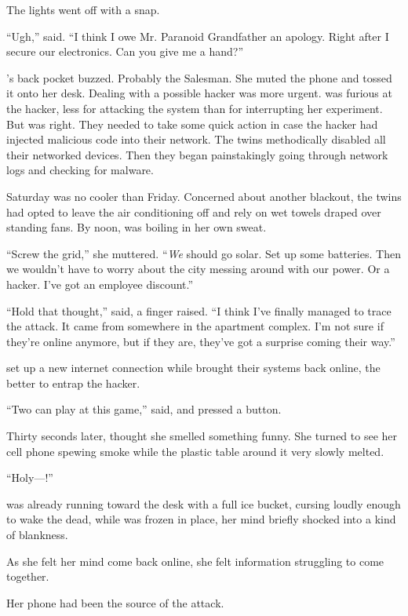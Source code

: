 The lights went off with a snap.

``Ugh,'' {\sidetag} said. ``I think I owe Mr. Paranoid Grandfather an apology. Right after I secure our electronics. Can you give me a hand?''

{\protag}'s back pocket buzzed. Probably the Salesman. She muted the phone and tossed it onto her desk. Dealing with a possible hacker was more urgent. {\protag} was furious at the hacker, less for attacking the system than for interrupting her experiment. But {\sidetag} was right. They needed to take some quick action in case the hacker had injected malicious code into their network. The twins methodically disabled all their networked devices. Then they began painstakingly going through network logs and checking for malware.

Saturday was no cooler than Friday. Concerned about another blackout, the twins had opted to leave the air conditioning off and rely on wet towels draped over standing fans. By noon, {\protag} was boiling in her own sweat.

``Screw the grid,'' she muttered. ``\emph{We} should go solar. Set up some batteries. Then we wouldn't have to worry about the city messing around with our power. Or a hacker. I've got an employee discount.''

``Hold that thought,'' {\sidetag} said, a finger raised. ``I think I've finally managed to trace the attack. It came from somewhere in the apartment complex. I'm not sure if they're online anymore, but if they are, they've got a surprise coming their way.''

{\sidetag} set up a new internet connection while {\protag} brought their systems back online, the better to entrap the hacker.

``Two can play at this game,'' {\sidetag} said, and pressed a button.

Thirty seconds later, {\protag} thought she smelled something funny. She turned to see her cell phone spewing smoke while the plastic table around it very slowly melted.

``Holy---{\sidetag}!''

{\sidetag} was already running toward the desk with a full ice bucket, cursing loudly enough to wake the dead, while {\protag} was frozen in place, her mind briefly shocked into a kind of blankness.

As she felt her mind come back online, she felt information struggling to come together.

Her phone had been the source of the attack.

